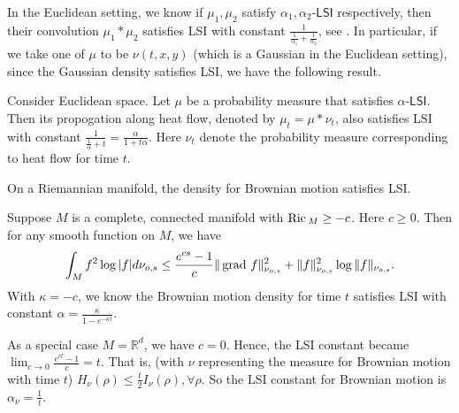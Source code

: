 In the Euclidean setting, we know if $\mu_{1}, \mu_{2}$ satisfy $\alpha_{1}, \alpha_{2}$-$\mathsf{LSI}$ respectively, 
then their convolution $\mu_{1} * \mu_{2}$ satisfies LSI with constant $ \frac{1}{\frac{1}{\alpha_{1}} + \frac{1}{\alpha_{2}}}$, {see \citet[Proposition 2.3.7]{chewi2023log}}.
In particular, if we take one of $\mu$ to be $\nu(t, x, y)$ (which is a Gaussian in the Euclidean setting), since the Gaussian density satisfies LSI, we have the following result. 
\begin{fact}
    Consider Euclidean space.
    Let $\mu$ be a probability measure that satisfies $\alpha$-$\mathsf{LSI}$. 
    Then its propogation along heat flow, denoted by $\mu_{t} = \mu * \nu_{t}$, 
    also satisfies LSI with constant $\frac{1}{\frac{1}{\alpha} + t} = \frac{\alpha}{1 + t\alpha}$. Here $\nu_{t}$ denote the probability measure corresponding to heat flow for time $t$.
\end{fact}
On a Riemannian manifold, the density for Brownian motion satisfies LSI. 
\begin{theorem}{\cite[Theorem 3.1]{hsu1997logarithmic}}
    Suppose $M$ is a complete, connected manifold with $\operatorname{Ric\,}_{M} \ge -c$. Here $c \ge 0$.
    Then for any smooth function on $M$, we have 
    \begin{align*}
        \int_{M} f^{2} \log |f| d\nu_{o, s} 
        \le \frac{e^{cs} - 1}{c} \|\operatorname{grad\,} f\|_{\nu_{o, s}}^{2} 
        + \|f\|_{\nu_{o, s}}^{2} \log \|f\|_{\nu_{o, s}}.
    \end{align*}
    With $\kappa = -c$, we know the Brownian motion density for time $t$ satisfies LSI with constant
    $\alpha = \frac{\kappa}{1 - e^{-\kappa t}}$.
\end{theorem}

As a special case $M = \mathbb{R}^{d}$, we have $c = 0$. Hence, the LSI constant became $\lim_{c \to 0} \frac{e^{ct} - 1}{c} = t$.
That is, (with $\nu$ representing the measure for Brownian motion with time $t$) 
$H_{\nu}(\rho) \le \frac{t}{2} I_{\nu}(\rho), \forall \rho$.
So the LSI constant for Brownian motion is $\alpha_{\nu} = \frac{1}{t}$.

